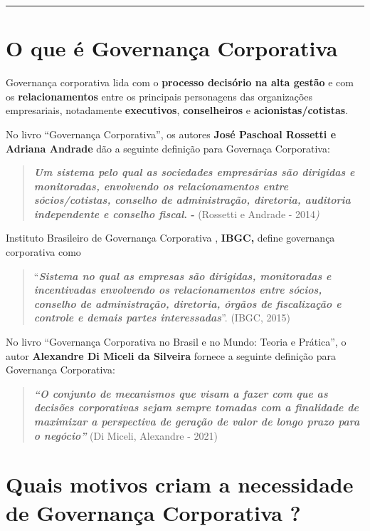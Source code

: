 \documentclass[
]{book}
\begin{document}
\begin{center}\rule{0.5\linewidth}{0.5pt}\end{center}

\section{O que é Governança Corporativa}\label{o-que-uxe9-governanuxe7a-corporativa}

Governança corporativa lida com o \textbf{processo decisório na alta gestão} e com os \textbf{relacionamentos} entre os principais personagens das organizações empresariais, notadamente \textbf{executivos}, \textbf{conselheiros} e \textbf{acionistas/cotistas}.

No livro ``Governança Corporativa'', os autores \textbf{José Paschoal Rossetti e Adriana Andrade} dão a seguinte definição para Governaça Corporativa:

\begin{quote}
\textbf{\emph{Um sistema pelo qual as sociedades empresárias são dirigidas e monitoradas, envolvendo os relacionamentos entre sócios/cotistas, conselho de administração, diretoria, auditoria independente e conselho fiscal}. -} (Rossetti e Andrade - 2014\emph{)}
\end{quote}

Instituto Brasileiro de Governança Corporativa , \textbf{IBGC,} define governança corporativa como

\begin{quote}
``\textbf{\emph{Sistema no qual as empresas são dirigidas, monitoradas e incentivadas envolvendo os relacionamentos entre sócios, conselho de administração, diretoria, órgãos de fiscalização e controle e demais partes interessadas}}''. (IBGC, 2015)
\end{quote}

No livro ``Governança Corporativa no Brasil e no Mundo: Teoria e Prática'', o autor \textbf{Alexandre Di Miceli da Silveira} fornece a seguinte definição para Governança Corporativa:

\begin{quote}
\textbf{\emph{``O conjunto de mecanismos que visam a fazer com que as decisões corporativas sejam sempre
tomadas com a finalidade de maximizar a perspectiva de geração de valor de longo
prazo para o negócio''}} (Di Miceli, Alexandre - 2021)
\end{quote}

\section{Quais motivos criam a necessidade de Governança Corporativa ?}\label{quais-motivos-criam-a-necessidade-de-governanuxe7a-corporativa}
\end{document}
